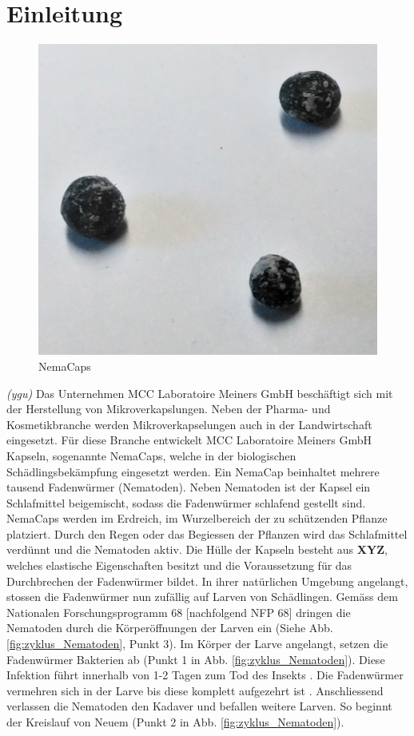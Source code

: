 \newpage
\section{Einleitung}
\begin{figure}
	\includegraphics[scale=0.18]{Illustrationen/3-Einleitung/nemacaps.jpg}
	\caption{NemaCaps}
	\label{fig:nemacaps}
\end{figure}
\textit{(ygu)} Das Unternehmen MCC Laboratoire Meiners GmbH beschäftigt sich mit der Herstellung von Mikroverkapslungen. Neben der Pharma- und Kosmetikbranche werden Mikroverkapselungen auch in der Landwirtschaft eingesetzt. Für diese Branche entwickelt MCC Laboratoire Meiners GmbH Kapseln, sogenannte NemaCaps, welche in der biologischen Schädlingsbekämpfung eingesetzt werden. Ein NemaCap beinhaltet mehrere tausend Fadenwürmer (Nematoden). Neben Nematoden ist der Kapsel ein Schlafmittel beigemischt, sodass die Fadenwürmer schlafend gestellt sind. 
\newline
NemaCaps werden im Erdreich, im Wurzelbereich der zu schützenden Pflanze platziert. Durch den Regen oder das Begiessen der Pflanzen wird das Schlafmittel verdünnt und die Nematoden aktiv. Die Hülle der Kapseln besteht aus \textbf{XYZ}, welches elastische Eigenschaften besitzt und die Voraussetzung für das Durchbrechen der Fadenwürmer bildet. 
\newline
In ihrer natürlichen Umgebung angelangt, stossen die Fadenwürmer nun zufällig auf Larven von Schädlingen. Gemäss dem Nationalen Forschungsprogramm 68 [nachfolgend NFP 68]\cite{nfp} dringen die Nematoden durch die Körperöffnungen der Larven ein (Siehe Abb.  \ref{fig:zyklus_Nematoden}, Punkt 3). Im Körper der Larve angelangt, setzen die Fadenwürmer Bakterien ab (Punkt 1 in Abb.  \ref{fig:zyklus_Nematoden}). Diese Infektion führt innerhalb von 1-2 Tagen zum Tod des Insekts \cite{e-nema}. Die Fadenwürmer vermehren sich in der Larve bis diese komplett aufgezehrt ist \cite{nematoden}. Anschliessend verlassen die Nematoden den Kadaver und befallen weitere Larven. So beginnt der Kreislauf von Neuem (Punkt 2 in Abb.  \ref{fig:zyklus_Nematoden}).
\newline

